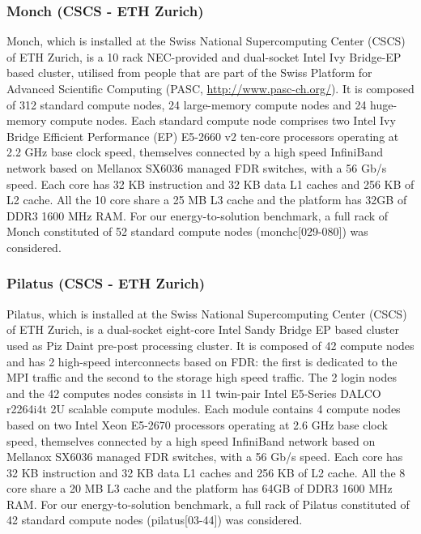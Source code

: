 \subsubsection{Monch (CSCS - ETH Zurich)}
Monch, which is installed  at the Swiss National Supercomputing Center
(CSCS) of ETH Zurich, is  a 10 rack NEC-provided and dual-socket Intel
Ivy Bridge-EP based cluster, utilised from people that are part of the
Swiss    Platform   for    Advanced   Scientific    Computing   (PASC,
\url{http://www.pasc-ch.org/}). It is composed of 312 standard compute
nodes, 24 large-memory compute nodes and 24 huge-memory compute nodes.
Each standard  compute node comprises  two Intel Ivy  Bridge Efficient
Performance (EP)  E5-2660 v2 ten-core processors operating  at 2.2 GHz
base  clock speed,  themselves connected  by a  high  speed InfiniBand
network based on Mellanox SX6036  managed FDR switches, with a 56 Gb/s
speed.  Each core  has 32 KB instruction and 32 KB  data L1 caches and
256 KB  of L2 cache. All  the 10 core share  a 25 MB L3  cache and the
platform has  32GB of  DDR3 1600 MHz  RAM. For  our energy-to-solution
benchmark, a  full rack  of Monch constituted  of 52  standard compute
nodes (monchc[029-080]) was considered.

\subsubsection{Pilatus (CSCS - ETH Zurich)}
Pilatus,  which  is installed  at  the  Swiss National  Supercomputing
Center (CSCS) of  ETH Zurich, is a dual-socket  eight-core Intel Sandy
Bridge EP based cluster used as Piz Daint pre-post processing cluster.
It is composed of 42  compute nodes and has 2 high-speed interconnects
based on FDR: the first is dedicated to the MPI traffic and the second
to  the storage  high speed  traffic.  The  2 login  nodes and  the 42
computes nodes consists in 11 twin-pair Intel E5-Series DALCO r2264i4t
2U  scalable compute modules.   Each module  contains 4  compute nodes
based on two  Intel Xeon E5-2670 processors operating  at 2.6 GHz base
clock speed,  themselves connected by a high  speed InfiniBand network
based  on  Mellanox  SX6036  managed  FDR switches,  with  a  56  Gb/s
speed. Each  core has 32 KB instruction  and 32 KB data  L1 caches and
256 KB  of L2 cache.  All  the 8 core share  a 20 MB L3  cache and the
platform has  64GB of  DDR3 1600 MHz  RAM. For  our energy-to-solution
benchmark, a full  rack of Pilatus constituted of  42 standard compute
nodes (pilatus[03-44]) was considered.

